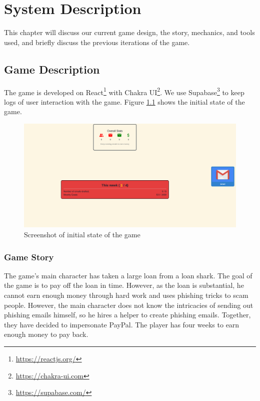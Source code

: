 




\chapter{System Description}

This chapter will discuss our current game design, the story, mechanics, and tools used, and briefly discuss the previous iterations of the game.

\section{Game Description}
The game is developed on React\footnote{\url{https://reactjs.org/}} with Chakra UI\footnote{\url{https://chakra-ui.com}}. We use Supabase\footnote{\url{https://supabase.com/}} to keep logs of user interaction with the game. Figure \ref{fig:screenshot} shows the initial state of the game.

\begin{figure}[h]
    \centering
    \includegraphics[width=\textwidth]{figures/section2/game.png}
    \caption{Screenshot of initial state of the game}
    \label{fig:screenshot}
\end{figure}

\subsection{Game Story}
The game's main character has taken a large loan from a loan shark. The goal of the game is to pay off the loan in time. However, as the loan is substantial, he cannot earn enough money through hard work and uses phishing tricks to scam people. However, the main character does not know the intricacies of sending out phishing emails himself, so he hires a helper to create phishing emails. Together, they have decided to impersonate PayPal. The player has four weeks to earn enough money to pay back.

